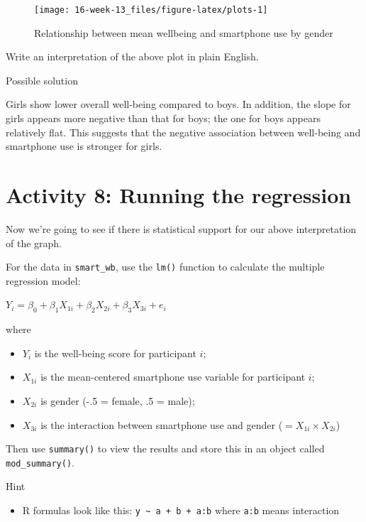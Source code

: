\documentclass[]{book}
\providecommand{\tightlist}{%
  \setlength{\itemsep}{0pt}\setlength{\parskip}{0pt}}
\begin{document}
\begin{figure}

{\centering \texttt{[image: 16-week-13\_files/figure-latex/plots-1]} 

}

\caption{Relationship between mean wellbeing and smartphone use by gender}\label{fig:plots}
\end{figure}

Write an interpretation of the above plot in plain English.

Possible solution

Girls show lower overall well-being compared to boys. In addition, the slope for girls appears more negative than that for boys; the one for boys appears relatively flat. This suggests that the negative association between well-being and smartphone use is stronger for girls.

\hypertarget{activity-8-running-the-regression}{%
\section{Activity 8: Running the regression}\label{activity-8-running-the-regression}}

Now we're going to see if there is statistical support for our above interpretation of the graph.

For the data in \texttt{smart\_wb}, use the \texttt{lm()} function to calculate the multiple regression model:

\(Y_i = \beta_0 + \beta_1 X_{1i} + \beta_2 X_{2i} + \beta_3 X_{3i} + e_i\)

where

\begin{itemize}
\tightlist
\item
  \(Y_i\) is the well-being score for participant \(i\);
\item
  \(X_{1i}\) is the mean-centered smartphone use variable for participant \(i\);
\item
  \(X_{2i}\) is gender (-.5 = female, .5 = male);
\item
  \(X_{3i}\) is the interaction between smartphone use and gender (\(= X_{1i} \times X_{2i}\))
\end{itemize}

Then use \texttt{summary()} to view the results and store this in an object called \texttt{mod\_summary()}.

Hint

\begin{itemize}
\tightlist
\item
  R formulas look like this: \texttt{y\ \textasciitilde{}\ a\ +\ b\ +\ a:b} where \texttt{a:b} means interaction
\end{itemize}
\end{document}
